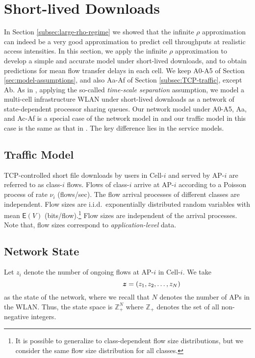 \documentclass[10pt,a4paper,journal]{IEEEtran}
\theoremstyle{definition}
\theoremstyle{remark}
\theoremstyle{plain}
\newcommand{\bmath}[1]{\mbox{\boldmath$#1$}}
\newcommand{\EXP}[1]{\mathsf{E}\!\left(#1\right)}
\begin{document}
\section{Short-lived Downloads}
\label{sec:short-lived}

In Section \ref{subsec:large-rho-regime} we showed that the infinite $\rho$ approximation can indeed be a very good approximation to predict cell throughputs at realistic access intensities. In this section, we apply the infinite $\rho$ approximation to develop a simple and accurate model under short-lived downloads, and to obtain predictions for mean flow transfer delays in each cell. We keep A0-A5 of Section \ref{sec:model-assumptions}, and also Aa-Af of Section \ref{subsec:TCP-traffic}, except Ab. As in \cite{wanet.bonald08multicellprocsharing}, applying the so-called \textit{time-scale separation} assumption, we model a multi-cell infrastructure WLAN under short-lived downloads as a network of state-dependent processor sharing queues. Our network model under A0-A5, Aa, and Ac-Af is a special case of the network model in \cite{wanet.bonald08multicellprocsharing} and our traffic model in this case is the same as that in \cite{wanet.bonald08multicellprocsharing}. The key difference lies in the service models. 




\subsection{Traffic Model}
\label{subsubsec:traffic-model}

TCP-controlled short file downloads by users in Cell-$i$ and served by AP-$i$ are referred to as class-$i$ flows. Flows of class-$i$ arrive at AP-$i$ according to a Poisson process of rate $\nu_i$ (flows/sec). The flow arrival processes of different classes are independent. Flow sizes are i.i.d.~exponentially distributed random variables with mean $\EXP{V}$ (bits/flow).\footnote{It is possible to generalize to class-dependent flow size distributions, but we consider the same flow size distribution for all classes.} Flow sizes are independent of the arrival processes. Note that, flow sizes correspond to \textit{application-level} data.


\subsection{Network State}
\label{subsubsec:network-state}

Let $z_i$ denote the number of ongoing flows at AP-$i$ in Cell-$i$. We take 
\[\quad \quad \quad \quad \quad \quad \quad \bmath{z} = (z_1, z_2,\ldots, z_N)\] 
as the state of the network, where we recall that $N$ denotes the number of APs in the WLAN. Thus, the state space is $\mathbb{Z}_+^N$ where $\mathbb{Z}_+$ denotes the set of all non-negative integers. 
\end{document}
